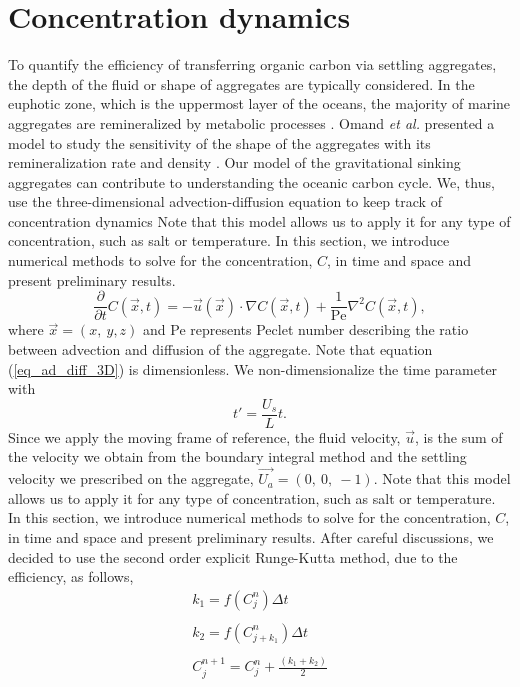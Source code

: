 \section{Concentration dynamics}
To quantify the efficiency of transferring organic carbon via settling aggregates, the depth of the fluid or shape of aggregates are typically considered.
In the euphotic zone, which is the uppermost layer of the oceans, the majority of marine aggregates are remineralized by metabolic processes \cite{henson_global_2012}. Omand {\it{et al.}} presented a model to study the sensitivity of the shape of the aggregates with its remineralization rate and density \cite{omand_sinking_2020}. 
Our model of the gravitational sinking aggregates can contribute to understanding the oceanic carbon cycle. We, thus, use the three-dimensional advection-diffusion equation to keep track of concentration dynamics
Note that this model allows us to apply it for any type of concentration, such as salt or temperature. 
In this section, we introduce numerical methods to solve for the concentration, $C$, in time and space and present preliminary results.
\begin{equation}
	\frac{\partial  }{\partial t} C(\vec{x}, t)
	= -\vec{u}(\vec{x}) \cdot \nabla C(\vec{x}, t)
	+ \frac{1}{\text{Pe}} \nabla^2 C(\vec{x}, t),
	\label{eq_ad_diff_3D}
\end{equation}
where $\vec{x} = (x, \ y, z)$ and Pe represents Peclet number describing the ratio between advection and diffusion of the aggregate. 
Note that equation (\ref{eq_ad_diff_3D}) is dimensionless. We non-dimensionalize the time parameter with 
\[
t' = \frac{U_s}{L} t.
\]
Since we apply the moving frame of reference, the fluid velocity, $\vec{u}$, is the sum of the velocity we obtain from the boundary integral method and the settling velocity we prescribed on the aggregate, $\vec{U_a} = (0, \ 0, \ -1)$.
Note that this model allows us to apply it for any type of concentration, such as salt or temperature. 
In this section, we introduce numerical methods to solve for the concentration, $C$, in time and space and present preliminary results.
After careful discussions, we decided to use the second order explicit Runge-Kutta method, due to the efficiency, as follows,
\begin{align}
	k_1 =  f \left( C_j^{n} \right) \Delta t \\ \nonumber
	\\ 
	k_2 = f \left(C_{j+k_1}^{n} \right) \Delta t\\ \nonumber
	\\ 
	C_j^{n+1} = C_j^{n} + \frac{\left(k_1 + k_2 \right)}{2}
\end{align}
